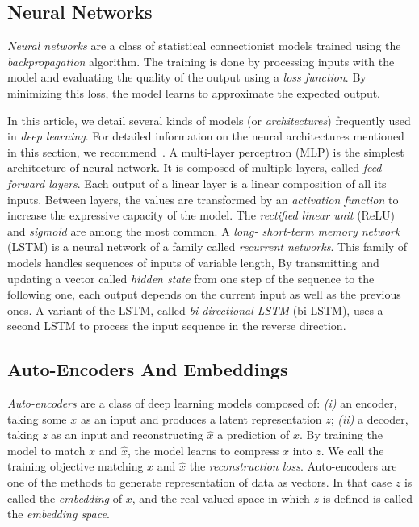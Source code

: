 
\subsection{Neural Networks}
\textit{Neural networks} are a class of statistical connectionist models trained using the \textit{backpropagation} algorithm.
The training is done by processing inputs with the model and evaluating the quality of the output using a \textit{loss function}.
By minimizing this loss, the model learns to approximate the expected output.

In this article, we detail several kinds of models (or \textit{architectures}) frequently used in \textit{deep learning}.
For detailed information on the neural architectures mentioned in this section, we recommend~\cite{tuto-lstm:2019:staudemeyer}.
A multi-layer perceptron (MLP) is the simplest architecture of neural network.
It is composed of multiple layers, called \textit{feed-forward layers}.
Each output of a linear layer is a linear composition of all its inputs.
Between layers, the values are transformed by an \textit{activation function} to increase the expressive capacity of the model.
The \textit{rectified linear unit} (ReLU) and \textit{sigmoid} are among the most common.
A \textit{long- short-term memory network} (LSTM) is a neural network of a family called \textit{recurrent networks}.
This family of models handles sequences of inputs of variable length, 
By transmitting and updating a vector called \textit{hidden state} from one step of the sequence to the following one, each output depends on the current input as well as the previous ones.
A variant of the LSTM, called \textit{bi-directional LSTM} (bi-LSTM), uses a second LSTM to process the input sequence in the reverse direction.%

\subsection{Auto-Encoders And Embeddings}
\textit{Auto-encoders} are a class of deep learning models composed of:
\textit{(i)} an encoder, taking some $x$ as an input and produces a latent representation $z$;
\textit{(ii)} a decoder, taking $z$ as an input and reconstructing $\hat{x}$ a prediction of $x$.
By training the model to match $x$ and $\hat{x}$, the model learns to compress $x$ into $z$. We call the training objective matching $x$ and $\hat{x}$ the \textit{reconstruction loss}.
Auto-encoders are one of the methods to generate representation of data as vectors. In that case $z$ is called the \textit{embedding} of $x$, and the real-valued space in which $z$ is defined is called the \textit{embedding space}.

